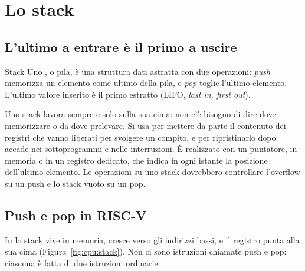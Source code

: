 \section{Lo stack}

\subsection{L'ultimo a entrare è il primo a uscire}

\begin{definition}{Stack}
Uno , o pila, è una struttura dati astratta con due operazioni:
\emph{push} memorizza un elemento come ultimo della pila, e \emph{pop} toglie
l'ultimo elemento. L'ultimo valore inserito è il primo estratto (LIFO,
\emph{last in, first out}).
\end{definition}

Uno stack lavora sempre e solo sulla sua cima: non c'è bisogno di dire dove
memorizzare o da dove prelevare. Si usa per mettere da parte il contenuto dei
registri che vanno liberati per svolgere un compito, e per ripristinarlo dopo:
accade nei sottoprogrammi e nelle interruzioni. È realizzato con un puntatore,
in memoria o in un registro dedicato, che indica in ogni istante la posizione
dell'ultimo elemento. Le operazioni su uno stack dovrebbero controllare
l'overflow su un push e lo stack vuoto su un pop.

\subsection{Push e pop in RISC-V}

In \riscv lo stack vive in memoria, cresce verso gli indirizzi bassi, e il
registro  punta alla sua cima (Figura~\ref{fig:cpu:stack}). Non ci sono
istruzioni chiamate push e pop: ciascuna è fatta di due istruzioni ordinarie.


